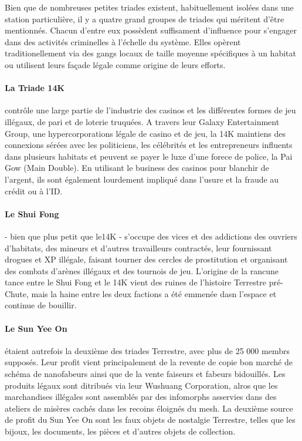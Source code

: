Bien que de nombreuses petites triades existent, habituellement isolées dans une station particulière, il y a quatre grand groupes de triades qui méritent d'être mentionnés. Chacun d'entre eux possèdent suffisament d'influence pour s'engager dans des activités criminelles à l'échelle du système. Elles opèrent traditionellement via des gangs locaux de taille moyenne spécifiques à un habitat ou utilisent leurs façade légale comme origine de leurs efforts. 

\paragraph{La Triade 14K} \label{sec:14k-triad} contrôle une large partie de l'industrie des casinos et les différentes formes de jeu illégaux, de pari et de loterie truquées. A travers leur Galaxy Entertainment Group, une hypercorporations légale de casino et de jeu, la 14K maintiens des connexions sérées avec les politiciens, les célébrités et les entrepreneurs influents dans plusieurs habitats et peuvent se payer le luxe d'une forece de police, la Pai Gow (Main Double). En utilisant le business des casinos pour blanchir de l'argent, ils sont également lourdement impliqué dans l'usure et la fraude au crédit ou à l'ID. 

\paragraph{Le Shui Fong} \label{sec:shui-fong} - bien que plus petit que le14K - s'occupe des vices et des addictions des ouvriers d'habitats, des mineurs et d'autres travailleurs contractés, leur fournissant drogues et XP illégale, faisant tourner des cercles de prostitution et organisant des combats d'arènes illégaux et des tournois de jeu. L'origine de la rancune tance entre le  Shui Fong et le 14K vient des ruines de l'histoire Terrestre pré-Chute, mais la haine entre les deux factions a été emmenée dasn l'espace et continue de bouillir. 

\paragraph{Le Sun Yee On} \label{sec:sun-yee} étaient autrefois la deuxième des triades Terrestre, avec plus de 25 000 membrs supposés. Leur profit vient principalement de la revente de copie bon marché de schéma de nanofabeurs ainsi que de la vente faiseurs et fabeurs bidouillés. Les produits légaux sont ditribués via leur Wushuang Corporation, alros que les marchandises illégales sont assemblés par des infomorphs asservies dans des ateliers de misères cachés dans les recoins éloignés du mesh. La deuxième source de profit du Sun Yee On sont les faux objets de nostalgie Terrestre, telles que les bijoux, les documents, les pièces et d'autres objets de collection. 

